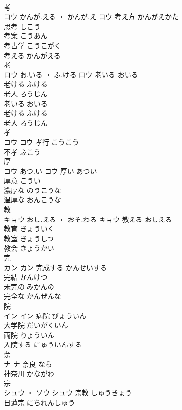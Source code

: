 \documentclass[8pt]{extreport}
\begin{document}
\begin{CJK}{UTF8}{min}
\\	考	
\\	コウ	かんが.える ・ かんが.え	コウ	考え方	かんがえかた	
\\	思考	しこう	
\\	考案	こうあん	
\\	考古学	こうこがく	
\\	考える	かんがえる	
\\	老	
\\	ロウ	お.いる ・ ふ.ける	ロウ	老いる	おいる	
\\	老ける	ふける	
\\	老人	ろうじん	
\\	老いる	おいる	
\\	老ける	ふける	
\\	老人	ろうじん	
\\	孝	
\\	コウ		コウ													孝行	こうこう	
\\	不孝	ふこう	
\\	厚	
\\	コウ	あつ.い	コウ	厚い	あつい	
\\	厚意	こうい	
\\	濃厚な	のうこうな	
\\	温厚な	おんこうな	
\\	教	
\\	キョウ	おし.える ・ おそ.わる	キョウ	教える	おしえる	
\\	教育	きょういく	
\\	教室	きょうしつ	
\\	教会	きょうかい	
\\	完	
\\	カン		カン	完成する	かんせいする	
\\	完結	かんけつ	
\\	未完の	みかんの	
\\	完全な	かんぜんな	
\\	院	
\\	イン		イン	病院	びょういん	
\\	大学院	だいがくいん	
\\	両院	りょういん	
\\	入院する	にゅういんする	
\\	奈	
\\	ナ		ナ													奈良	なら	
\\	神奈川	かながわ	
\\	宗	
\\	シュウ ・ ソウ		シュウ	宗教	しゅうきょう	
\\	日蓮宗	にちれんしゅう	

\end{CJK}
\end{document}
